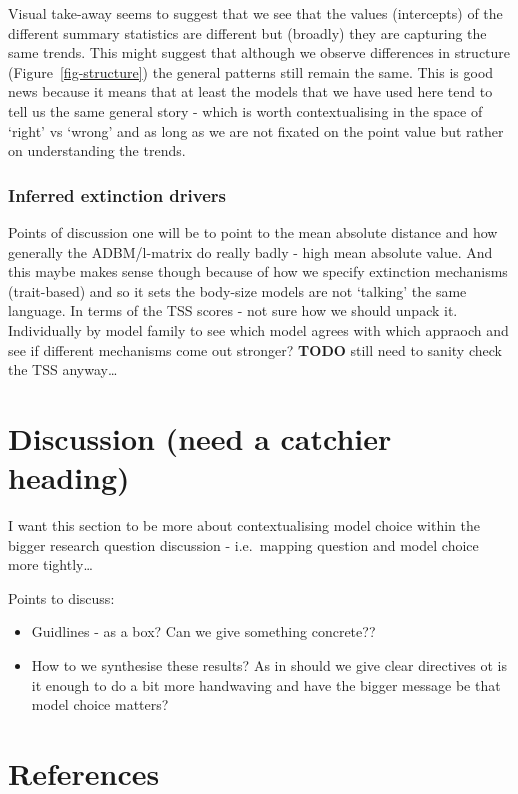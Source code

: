 \documentclass[
]{article}
\providecommand{\tightlist}{%
  \setlength{\itemsep}{0pt}\setlength{\parskip}{0pt}}
\begin{document}
Visual take-away seems to suggest that we see that the values
(intercepts) of the different summary statistics are different but
(broadly) they are capturing the same trends. This might suggest that
although we observe differences in structure
(Figure~\ref{fig-structure}) the general patterns still remain the same.
This is good news because it means that at least the models that we have
used here tend to tell us the same general story - which is worth
contextualising in the space of `right' vs `wrong' and as long as we are
not fixated on the point value but rather on understanding the trends.

\subsubsection{Inferred extinction
drivers}\label{inferred-extinction-drivers}

Points of discussion one will be to point to the mean absolute distance
and how generally the ADBM/l-matrix do really badly - high mean absolute
value. And this maybe makes sense though because of how we specify
extinction mechanisms (trait-based) and so it sets the body-size models
are not `talking' the same language. In terms of the TSS scores - not
sure how we should unpack it. Individually by model family to see which
model agrees with which appraoch and see if different mechanisms come
out stronger? \textbf{TODO} still need to sanity check the TSS
anyway\ldots{}

\section{Discussion (need a catchier
heading)}\label{discussion-need-a-catchier-heading}

I want this section to be more about contextualising model choice within
the bigger research question discussion - i.e.~mapping question and
model choice more tightly\ldots{}

Points to discuss:

\begin{itemize}
\tightlist
\item
  Guidlines - as a box? Can we give something concrete??
\item
  How to we synthesise these results? As in should we give clear
  directives ot is it enough to do a bit more handwaving and have the
  bigger message be that model choice matters?
\end{itemize}

\section*{References}\label{references}
\end{document}
